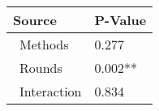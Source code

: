 
\centering
\begin{tabular}{ll}
\toprule
          Source & P-Value \\
\midrule
    \    Methods &   0.277 \\
     \    Rounds & 0.002** \\
\    Interaction &   0.834 \\
\bottomrule
\end{tabular}
